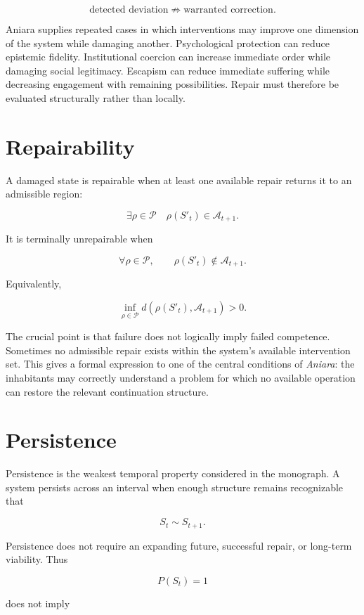 \documentclass[11pt,oneside]{book}
\theoremstyle{definition}
\theoremstyle{remark}
\begin{document}
\[
\boxed{ \text{detected deviation} \not\Rightarrow \text{warranted correction}. }
\]

Aniara supplies repeated cases in which interventions may improve one dimension of the system while
damaging another. Psychological protection can reduce epistemic fidelity. Institutional coercion can
increase immediate order while damaging social legitimacy. Escapism can reduce immediate suffering
while decreasing engagement with remaining possibilities. Repair must therefore be evaluated
structurally rather than locally.

\section{Repairability}

A damaged state is repairable when at least one available repair returns it to an admissible region:

\[
\exists\rho\in\mathcal{P} \quad \rho(S'_t)\in\mathcal{A}_{t+1}.
\]

It is terminally unrepairable when

\[
\forall\rho\in\mathcal{P}, \qquad \rho(S'_t)\notin\mathcal{A}_{t+1}.
\]

Equivalently,

\[
\inf_{\rho\in\mathcal{P}} d\!\left( \rho(S'_t), \mathcal{A}_{t+1} \right) >0.
\]

The crucial point is that failure does not logically imply failed competence. Sometimes no
admissible repair exists within the system's available intervention set. This gives a formal
expression to one of the central conditions of \emph{Aniara}: the inhabitants may correctly
understand a problem for which no available operation can restore the relevant continuation
structure.

\section{Persistence}

Persistence is the weakest temporal property considered in the monograph. A system persists across
an interval when enough structure remains recognizable that

\[
S_t\sim S_{t+1}.
\]

Persistence does not require an expanding future, successful repair, or long-term viability. Thus

\[
P(S_t)=1
\]

does not imply
\end{document}
